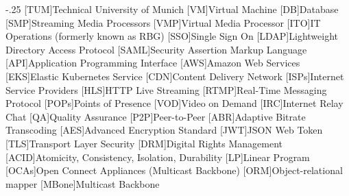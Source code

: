 \documentclass[headsepline,footsepline,footinclude=false,oneside,fontsize=11pt,paper=a4,listof=totoc,bibliography=totoc]{scrbook} %
\begin{document}


\frontmatter{}





\tableofcontents{}

\mainmatter{}






%





\appendix{}


\begin{acronym}
	\itemsep-.25\baselineskip
	[TUM]{Technical University of Munich}
 	[VM]{Virtual Machine}
 	[DB]{Database}
 	[SMP]{Streaming Media Processors}
 	[VMP]{Virtual Media Processor}
 	[ITO]{IT Operations (formerly known as RBG)}
 	[SSO]{Single Sign On}
 	[LDAP]{Lightweight Directory Access Protocol}
 	[SAML]{Security Assertion Markup Language}
 	[API]{Application Programming Interface}
 	[AWS]{Amazon Web Services}
 	[EKS]{Elastic Kubernetes Service}
 	[CDN]{Content Delivery Network}
 	[ISPs]{Internet Service Providers}
 	[HLS]{HTTP Live Streaming}
 	[RTMP]{Real-Time Messaging Protocol}
 	[POPs]{Points of Presence}
 	[VOD]{Video on Demand}
 	[IRC]{Internet Relay Chat}
 	[QA]{Quality Assurance}
 	[P2P]{Peer-to-Peer}
 	[ABR]{Adaptive Bitrate Transcoding}
 	[AES]{Advanced Encryption Standard}
 	[JWT]{JSON Web Token}
 	[TLS]{Transport Layer Security}
 	[DRM]{Digital Rights Management}
 	[ACID]{Atomicity, Consistency, Isolation, Durability}
 	[LP]{Linear Program}
 	[OCAs]{Open Connect Appliances}
   (Multicast Backbone)
    [ORM]{Object-relational mapper}
 	[MBone]{Multicast Backbone}  
\end{acronym}

\listoffigures{}
\listoftables{}
\printbibliography{}
\end{document}
